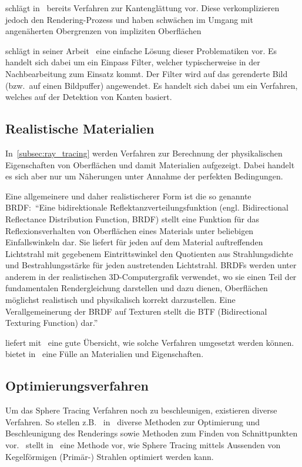 \citeauthor{hart_sphere_1994} schlägt in~
bereits Verfahren zur Kantenglättung vor. Diese verkomplizieren jedoch
den Rendering-Prozess und haben schwächen im Umgang mit angenäherten
Obergrenzen von impliziten Oberflächen

\citeauthor{timothy_lottes_fxaa_2009} schlägt in seiner
Arbeit~ eine einfache Lösung dieser
Problematiken vor. Es handelt sich dabei um ein Einpass
Filter, welcher typischerweise in der Nachbearbeitung zum Einsatz kommt.
Der Filter wird auf das gerenderte Bild (bzw.\ auf einen Bildpuffer)
angewendet. Es handelt sich dabei um ein Verfahren, welches auf der
Detektion von Kanten basiert.

\subsection{Realistische Materialien}
\label{subsec:further_work:brdf}

In~\autoref{subsec:ray_tracing} werden Verfahren zur Berechnung der
physikalischen Eigenschaften von Oberflächen und damit Materialien
aufgezeigt. Dabei handelt es sich aber nur um Näherungen unter Annahme
der perfekten Bedingungen.

Eine allgemeinere und daher realistischerer Form ist die so genannte
BRDF:\ ``Eine bidirektionale Reflektanzverteilungsfunktion (engl.
Bidirectional Reflectance Distribution Function, BRDF) stellt eine
Funktion für das Reflexionsverhalten von Oberflächen eines Materials
unter beliebigen Einfallswinkeln dar. Sie liefert für jeden auf dem
Material auftreffenden Lichtstrahl mit gegebenem Eintrittswinkel den
Quotienten aus Strahlungsdichte und Bestrahlungsstärke für jeden
austretenden Lichtstrahl. BRDFs werden unter anderem in der
realistischen 3D-Computergrafik verwendet, wo sie einen Teil der
fundamentalen Rendergleichung darstellen und dazu dienen, Oberflächen
möglichst realistisch und physikalisch korrekt darzustellen. Eine
Verallgemeinerung der BRDF auf Texturen stellt die BTF (Bidirectional
Texturing Function)
dar.''~\parencite{wikipedia_the_free_encyclopedia_bidirektionale_2014}

\citeauthor{brent_burley_physicall-based_2012} liefert
mit~ eine gute Übersicht,
wie solche Verfahren umgesetzt werden können.
\citeauthor{bagher_accurate_2012} bietet
in~ eine Fülle an Materialien und
Eigenschaften.

\subsection{Optimierungsverfahren}
\label{subsec:further_work:optimisation}

Um das Sphere Tracing Verfahren noch zu beschleunigen, existieren
diverse Verfahren. So stellen
z.B.~\citeauthor{benjamin_keiner_enhanced_2014}
in~ diverse Methoden zur
Optimierung und Beschleunigung des Renderings sowie Methoden zum Finden
von Schnittpunkten vor.~\citeauthor{seven_rendering_2012} stellt
in~ eine Methode vor, wie Sphere Tracing
mittels Aussenden von Kegelförmigen (Primär-) Strahlen optimiert werden
kann.
